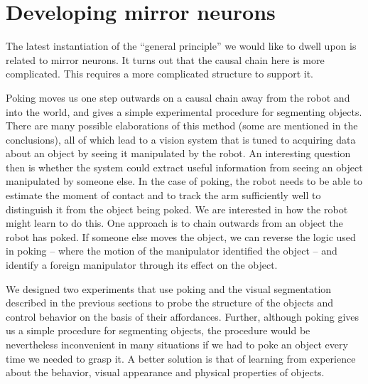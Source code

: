 
\section{Developing mirror neurons}

\ifverbose
The latest instantiation of the ``general principle'' we would like to
dwell upon is related to mirror neurons. It turns out that the causal
chain here is more complicated. This requires a more complicated
structure to support it.
\fi

Poking moves us one step outwards on a causal chain away from the
robot and into the world, and gives a simple experimental procedure
for segmenting objects.  There are many possible elaborations of this
method (some are mentioned in the conclusions), all of which lead to a
vision system that is tuned to acquiring data about an object by
seeing it manipulated by the robot.  An interesting question then is
whether the system could extract useful information from seeing an
object manipulated by someone else.  In the case of poking, the robot
needs to be able to estimate the moment of contact and to track the arm
sufficiently well to distinguish it from the object being poked.  We
are interested in how the robot might learn to do this.  One approach
is to chain outwards from an object the robot has poked.  If someone
else moves the object, we can reverse the logic used in poking --
where the motion of the manipulator identified the object -- and
identify a foreign manipulator through its effect on the object.

We designed two experiments that use poking and the visual
segmentation described in the previous sections to probe 
the structure of the objects and control behavior on the basis of
their affordances. Further, although poking gives us a simple 
procedure for segmenting objects, the procedure would be 
nevertheless inconvenient in many situations if we had to poke an 
object every time we needed to grasp it. A better solution is that 
of learning from experience about the behavior, visual appearance and 
physical properties of objects.

